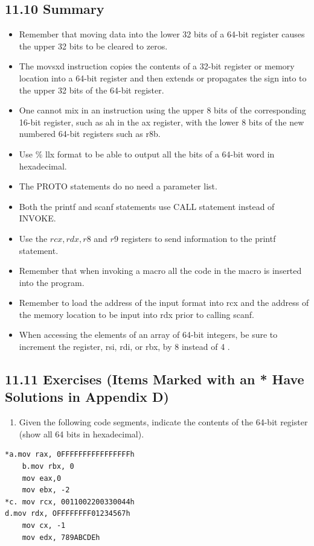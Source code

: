 \documentclass[10pt]{article}
\begin{document}
\subsection*{11.10 Summary}
\begin{itemize}
  \item Remember that moving data into the lower 32 bits of a 64-bit register causes the upper 32 bits to be cleared to zeros.
  \item The movsxd instruction copies the contents of a 32-bit register or memory location into a 64-bit register and then extends or propagates the sign into to the upper 32 bits of the 64-bit register.
  \item One cannot mix in an instruction using the upper 8 bits of the corresponding 16-bit register, such as ah in the ax register, with the lower 8 bits of the new numbered 64-bit registers such as r8b.
  \item Use \% llx format to be able to output all the bits of a 64-bit word in hexadecimal.
  \item The PROTO statements do no need a parameter list.
  \item Both the printf and scanf statements use CALL statement instead of INVOKE.
  \item Use the $r c x, r d x, r 8$ and $r 9$ registers to send information to the printf statement.
  \item Remember that when invoking a macro all the code in the macro is inserted into the program.
  \item Remember to load the address of the input format into rcx and the address of the memory location to be input into rdx prior to calling scanf.
  \item When accessing the elements of an array of 64-bit integers, be sure to increment the register, rsi, rdi, or rbx, by 8 instead of 4 .
\end{itemize}

\subsection*{11.11 Exercises (Items Marked with an * Have Solutions in Appendix D)}
\begin{enumerate}
  \item Given the following code segments, indicate the contents of the 64-bit register (show all 64 bits in hexadecimal).
\end{enumerate}

\begin{verbatim}
*a.mov rax, 0FFFFFFFFFFFFFFFFh
    b.mov rbx, 0
    mov eax,0
    mov ebx, -2
*c. mov rcx, 0011002200330044h
d.mov rdx, OFFFFFFFF01234567h
    mov cx, -1
    mov edx, 789ABCDEh
\end{verbatim}
\end{document}
